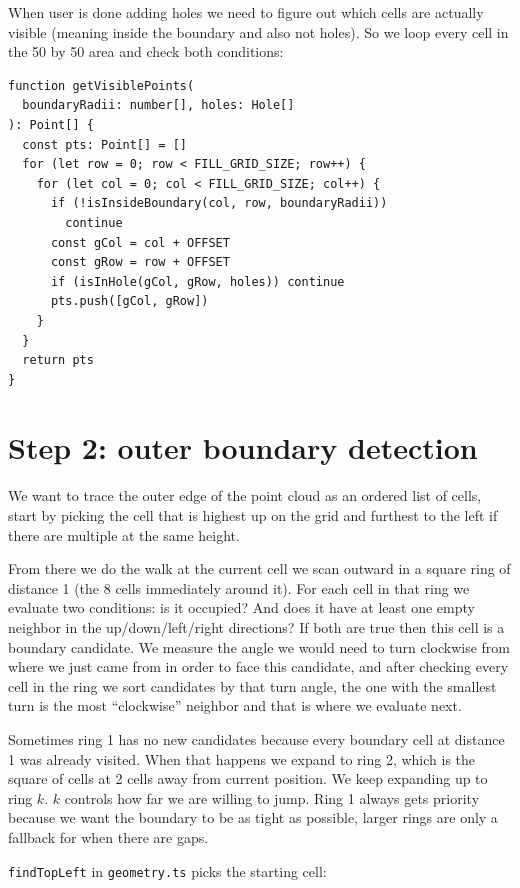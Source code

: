 \documentclass[12pt]{extreport}
\begin{document}
When user is done adding holes we need to figure out which cells are actually visible (meaning inside the boundary and also not holes). So we loop every cell in the 50 by 50 area and check both conditions:

\begin{lstlisting}[style=tsstyle, caption={Visible point collection (\texttt{grid.ts})}]
function getVisiblePoints(
  boundaryRadii: number[], holes: Hole[]
): Point[] {
  const pts: Point[] = []
  for (let row = 0; row < FILL_GRID_SIZE; row++) {
    for (let col = 0; col < FILL_GRID_SIZE; col++) {
      if (!isInsideBoundary(col, row, boundaryRadii))
        continue
      const gCol = col + OFFSET
      const gRow = row + OFFSET
      if (isInHole(gCol, gRow, holes)) continue
      pts.push([gCol, gRow])
    }
  }
  return pts
}
\end{lstlisting}

\section{Step 2: outer boundary detection}

We want to trace the outer edge of the point cloud as an ordered list of cells, start by picking the cell that is highest up on the grid and furthest to the left if there are multiple at the same height.

From there we do the walk at the current cell we scan outward in a square ring of distance 1 (the 8 cells immediately around it). For each cell in that ring we evaluate two conditions: is it occupied? And does it have at least one empty neighbor in the up/down/left/right directions? If both are true then this cell is a boundary candidate. We measure the angle we would need to turn clockwise from where we just came from in order to face this candidate, and after checking every cell in the ring we sort candidates by that turn angle, the one with the smallest turn is the most ``clockwise'' neighbor and that is where we evaluate next.

Sometimes ring 1 has no new candidates because every boundary cell at distance 1 was already visited. When that happens we expand to ring 2, which is the square of cells at 2 cells away from current position. We keep expanding up to ring $k$. $k$ controls how far we are willing to jump. Ring 1 always gets priority because we want the boundary to be as tight as possible, larger rings are only a fallback for when there are gaps.

\texttt{findTopLeft} in \texttt{geometry.ts} picks the starting cell:
\end{document}
